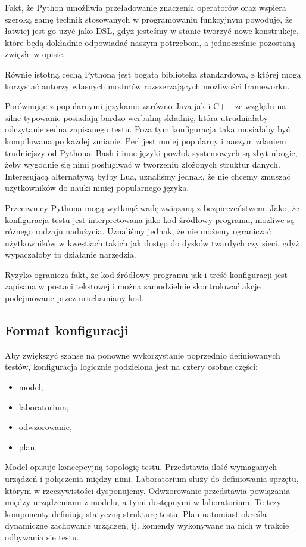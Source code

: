 \documentclass[00-praca-magisterska.tex]{subfiles}
\begin{document}
Fakt, że Python umożliwia przeładowanie znaczenia operatorów oraz wspiera
szeroką gamę technik stosowanych w programowaniu funkcyjnym powoduje, że
łatwiej jest go użyć jako DSL, gdyż jesteśmy w stanie tworzyć nowe konstrukcje,
które będą dokładnie odpowiadać naszym potrzebom, a jednocześnie pozostaną
zwięzłe w opisie.

Równie istotną cechą Pythona jest bogata biblioteka standardowa, z której mogą
korzystać autorzy własnych modułów rozszerzających możliwości frameworku.

Porównując z popularnymi językami: zarówno Java jak i C++ ze względu na
silne typowanie posiadają bardzo werbalną składnię, która utrudniałaby
odczytanie sedna zapisanego testu. Poza tym konfiguracja taka musiałaby być
kompilowana po każdej zmianie. Perl jest mniej popularny i naszym zdaniem
trudniejszy od Pythona. Bash i inne języki powłok systemowych są zbyt ubogie,
żeby wygodnie się nimi posługiwać w tworzeniu złożonych struktur danych.
Interesującą alternatywą byłby Lua, uznaliśmy jednak, że nie chcemy zmuszać
użytkowników do nauki mniej popularnego języka.

Przeciwnicy Pythona mogą wytknąć wadę związaną z bezpieczeństwem. Jako, że
konfiguracja testu jest interpretowana jako kod źródłowy programu, możliwe są
różnego rodzaju nadużycia. Uznaliśmy jednak, że nie możemy ograniczać
użytkowników w kwestiach takich jak dostęp do dysków twardych czy sieci, gdyż
wypaczałoby to działanie narzędzia.

Ryzyko ogranicza fakt, że kod źródłowy programu jak i treść konfiguracji jest
zapisana w postaci tekstowej i można samodzielnie skontrolować akcje
podejmowane przez uruchamiany kod.

\subsection{Format konfiguracji}

Aby zwiększyć szanse na ponowne wykorzystanie poprzednio definiowanych
testów, konfiguracja logicznie podzielona jest na cztery osobne części:
\begin{itemize}
\item model,
\item laboratorium,
\item odwzorowanie, 
\item plan.
\end{itemize}

Model opisuje koncepcyjną topologię testu. Przedstawia ilość wymaganych
urządzeń i połączenia między nimi. Laboratorium służy do definiowania sprzętu,
którym w rzeczywistości dysponujemy. Odwzorowanie przedstawia powiązania między
urządzeniami z modelu, a tymi dostępnymi w laboratorium. Te trzy komponenty
definiują statyczną strukturę testu. Plan natomiast określa dynamiczne
zachowanie urządzeń, tj.  komendy wykonywane na nich w trakcie odbywania się
testu.
\end{document}
